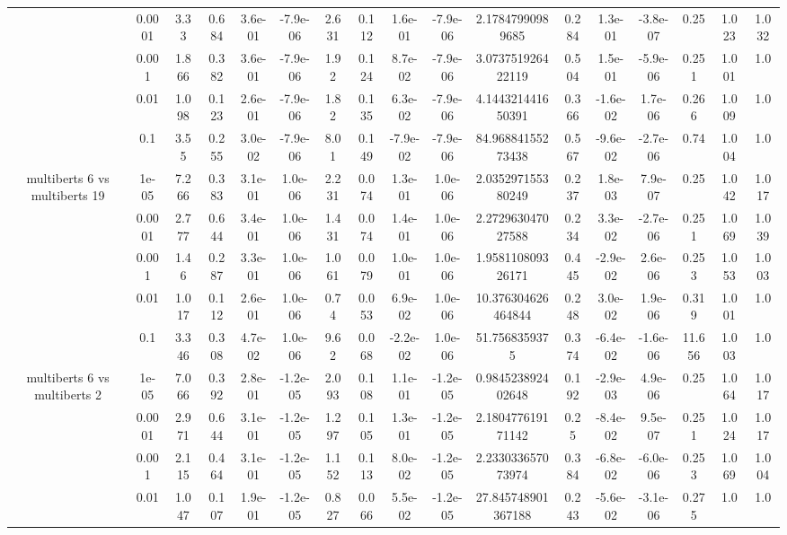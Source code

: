 \begin{tabular}{|c|c|c|c|c|c|c|c|c|c|c|c|c|c|c|c|c|}
 & 0.0001 & 3.33 & 0.684 & 3.6e-01 & -7.9e-06 & 2.631 & 0.112 & 1.6e-01 & -7.9e-06 & 2.17847990989685 & 0.284 & 1.3e-01 & -3.8e-07 & 0.25 & 1.023 & 1.032 \\
 & 0.001 & 1.866 & 0.382 & 3.6e-01 & -7.9e-06 & 1.92 & 0.124 & 8.7e-02 & -7.9e-06 & 3.073751926422119 & 0.504 & 1.5e-01 & -5.9e-06 & 0.251 & 1.001 & 1.0 \\
 & 0.01 & 1.098 & 0.123 & 2.6e-01 & -7.9e-06 & 1.82 & 0.135 & 6.3e-02 & -7.9e-06 & 4.144321441650391 & 0.366 & -1.6e-02 & 1.7e-06 & 0.266 & 1.009 & 1.0 \\
 & 0.1 & 3.55 & 0.255 & 3.0e-02 & -7.9e-06 & 8.01 & 0.149 & -7.9e-02 & -7.9e-06 & 84.96884155273438 & 0.567 & -9.6e-02 & -2.7e-06 & 0.74 & 1.004 & 1.0 \\
\hline
\multirow{5}{*}{multiberts 6 vs multiberts 19} & 1e-05 & 7.266 & 0.383 & 3.1e-01 & 1.0e-06 & 2.231 & 0.074 & 1.3e-01 & 1.0e-06 & 2.035297155380249 & 0.237 & 1.8e-03 & 7.9e-07 & 0.25 & 1.042 & 1.017 \\
 & 0.0001 & 2.777 & 0.644 & 3.4e-01 & 1.0e-06 & 1.431 & 0.074 & 1.4e-01 & 1.0e-06 & 2.272963047027588 & 0.234 & 3.3e-02 & -2.7e-06 & 0.251 & 1.069 & 1.039 \\
 & 0.001 & 1.46 & 0.287 & 3.3e-01 & 1.0e-06 & 1.061 & 0.079 & 1.0e-01 & 1.0e-06 & 1.958110809326171 & 0.445 & -2.9e-02 & 2.6e-06 & 0.253 & 1.053 & 1.003 \\
 & 0.01 & 1.017 & 0.112 & 2.6e-01 & 1.0e-06 & 0.74 & 0.053 & 6.9e-02 & 1.0e-06 & 10.376304626464844 & 0.248 & 3.0e-02 & 1.9e-06 & 0.319 & 1.001 & 1.0 \\
 & 0.1 & 3.346 & 0.308 & 4.7e-02 & 1.0e-06 & 9.62 & 0.068 & -2.2e-02 & 1.0e-06 & 51.7568359375 & 0.374 & -6.4e-02 & -1.6e-06 & 11.656 & 1.003 & 1.0 \\
\hline
\multirow{5}{*}{multiberts 6 vs multiberts 2} & 1e-05 & 7.066 & 0.392 & 2.8e-01 & -1.2e-05 & 2.093 & 0.108 & 1.1e-01 & -1.2e-05 & 0.984523892402648 & 0.192 & -2.9e-03 & 4.9e-06 & 0.25 & 1.064 & 1.017 \\
 & 0.0001 & 2.971 & 0.644 & 3.1e-01 & -1.2e-05 & 1.297 & 0.105 & 1.3e-01 & -1.2e-05 & 2.180477619171142 & 0.25 & -8.4e-02 & 9.5e-07 & 0.251 & 1.024 & 1.017 \\
 & 0.001 & 2.115 & 0.464 & 3.1e-01 & -1.2e-05 & 1.152 & 0.113 & 8.0e-02 & -1.2e-05 & 2.233033657073974 & 0.384 & -6.8e-02 & -6.0e-06 & 0.253 & 1.069 & 1.004 \\
 & 0.01 & 1.047 & 0.107 & 1.9e-01 & -1.2e-05 & 0.827 & 0.066 & 5.5e-02 & -1.2e-05 & 27.845748901367188 & 0.243 & -5.6e-02 & -3.1e-06 & 0.275 & 1.0 & 1.0 \\

\end{tabular}
